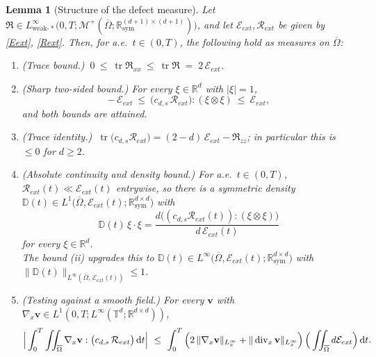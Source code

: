 \documentclass[12pt,a4paper,twoside]{article}
\newcommand{\Div}{\operatorname{div}}
\newcommand{\Grad}{\nabla}
\newcommand{\dt}{{\,\rm d} t }
\newtheorem{lemma}[thm]{Lemma}
\numberwithin{equation}{section}%
\begin{document}
\begin{lemma}[Structure of the defect measure]\label{lem:Rext-structure}
	Let $\mathfrak R \in L^\infty_{\mathrm{weak}\text{-}*}\big(0,T;\mathcal M^+(\overline\Omega;\mathbb R^{(d+1)\times(d+1)}_{\mathrm{sym}})\big)$, and let $\mathcal E_{ext},\mathcal R_{ext}$ be given by \eqref{Eext}, \eqref{Rext}. Then, for a.e.\ $t\in(0,T)$, the following hold as measures on $\overline\Omega$:
	\begin{enumerate}[leftmargin=*]
		\item[\rm(i)] \emph{(Trace bound.)} $\ 0 \ \le\ \operatorname{tr}\mathfrak R_{xx} \ \le\ \operatorname{tr}\mathfrak R \;=\; 2\,\mathcal E_{ext}$.
		\item[\rm(ii)] \emph{(Sharp two-sided bound.)} For every $\xi \in \mathbb R^d$ with $|\xi|=1$,
		\begin{equation}\label{defm-do-2}
			-\,\mathcal E_{ext} \ \le\ \big(c_{d,s}\,\mathcal R_{ext}\big) : (\xi\otimes\xi) \ \le\ \mathcal E_{ext} ,
		\end{equation}
		and both bounds are attained.
		\item[\rm(iii)] \emph{(Trace identity.)} $\ \operatorname{tr}\big(c_{d,s}\mathcal R_{ext}\big) = (2-d)\,\mathcal E_{ext} - {\mathfrak R_{zz}}$; in particular this is $\le 0$ for $d\ge2$.
		\item[\rm(iv)] \emph{(Absolute continuity and density bound.)} For a.e.\ $t\in(0,T)$,
		$\mathcal R_{ext}(t)\ll\mathcal E_{ext}(t)$ entrywise, so there is a symmetric density
		$\mathbb D(t)\in L^1\big(\overline\Omega,\mathcal E_{ext}(t);\mathbb R^{d\times d}_{\mathrm{sym}}\big)$
		with $$\mathbb D(t)\,\xi\cdot\xi=\dfrac{d\big((c_{d,s}\mathcal R_{ext}(t)):(\xi\otimes\xi)\big)}{d\,\mathcal E_{ext}(t)}$$
		for every $\xi\in\mathbb R^d$. \\ 
		The bound (ii) upgrades this to
		$\mathbb D(t)\in L^\infty\big(\overline\Omega,\mathcal E_{ext}(t);\mathbb R^{d\times d}_{\mathrm{sym}}\big)$
		with $\|\mathbb D(t)\|_{L^\infty(\overline\Omega,\,\mathcal E_{ext}(t))}\le1$.
		
		\item[\rm(v)] \emph{(Testing against a smooth field.)} For every $\mathbf v$ with $\Grad_x\mathbf v \in L^1(0,T; L^\infty(\mathbb T^d;\mathbb R^{d\times d}))$,
		\begin{equation}\label{Rext-test}
			\Big| \int_0^T \iint_{\overline\Omega} \Grad_x\mathbf v : \big(c_{d,s}\,\mathcal R_{ext}\big) \dt \Big|
			\ \le\ \int_0^T \Big( 2\,\|\Grad_x \mathbf v\|_{L^\infty_x} + \|\Div_x\mathbf v\|_{L^\infty_x} \Big)\, \Big(\iint_{\overline\Omega} d\mathcal E_{ext}\Big) \dt .
		\end{equation}
	
	\end{enumerate}
\end{lemma}
\end{document}
